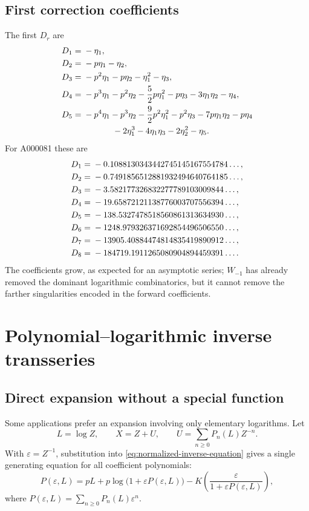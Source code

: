 \documentclass[11pt,a4paper,oneside,openany]{book}
\theoremstyle{definition}
\theoremstyle{remark}
\begin{document}
\section{First correction coefficients}
The first $D_r$ are
\begin{align}
 D_1={}&-\eta_1,\label{eq:D1}\\
 D_2={}&-p\eta_1-\eta_2,\label{eq:D2}\\
 D_3={}&-p^2\eta_1-p\eta_2-\eta_1^2-\eta_3,\label{eq:D3}\\
 D_4={}&-p^3\eta_1-p^2\eta_2-\frac52p\eta_1^2
         -p\eta_3-3\eta_1\eta_2-\eta_4,\label{eq:D4}\\
 D_5={}&-p^4\eta_1-p^3\eta_2-\frac92p^2\eta_1^2-p^2\eta_3
         -7p\eta_1\eta_2-p\eta_4\notag\\
      &\hspace{12mm}-2\eta_1^3-4\eta_1\eta_3-2\eta_2^2-\eta_5.
 \label{eq:D5}
\end{align}
For A000081 these are
\begin{align}
 D_1={}&-0.1088130343442745145167554784\ldots,\notag\\
 D_2={}&-0.7491856512881932494640764185\ldots,\notag\\
 D_3={}&-3.582177326832277789103009844\ldots,\notag\\
 D_4={}&-19.65872121138776003707556394\ldots,\notag\\
 D_5={}&-138.5327478518560861313634930\ldots,\notag\\
 D_6={}&-1248.979326371692854496506550\ldots,\notag\\
 D_7={}&-13905.40884474814835419890912\ldots,\notag\\
 D_8={}&-184719.1911265080904894459391\ldots.
 \label{eq:D-numeric}
\end{align}
The coefficients grow, as expected for an asymptotic series; $W_{-1}$ has
already removed the dominant logarithmic combinatorics, but it cannot remove
the farther singularities encoded in the forward coefficients.

\chapter{Polynomial--logarithmic inverse transseries}
\label{ch:polylog-inverse}

\section{Direct expansion without a special function}
Some applications prefer an expansion involving only elementary logarithms.
Let
\begin{equation}
 L=\log Z,
 \qquad
 X=Z+U,
 \qquad
 U=\sum_{n\ge0}P_n(L)Z^{-n}.
 \label{eq:P-ansatz}
\end{equation}
With $\varepsilon=Z^{-1}$, substitution into
\cref{eq:normalized-inverse-equation} gives a single generating equation for
all coefficient polynomials:
\begin{equation}
 \boxed{
 P(\varepsilon,L)=pL+p\log\bigl(1+\varepsilon P(\varepsilon,L)\bigr)
 -K\!\left(\frac{\varepsilon}
 {1+\varepsilon P(\varepsilon,L)}\right),}
 \label{eq:P-functional}
\end{equation}
where
$P(\varepsilon,L)=\sum_{n\ge0}P_n(L)\varepsilon^n$.
\end{document}
